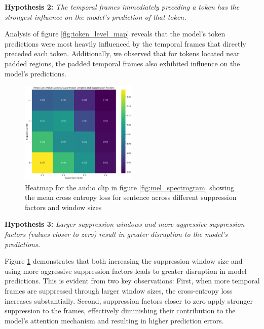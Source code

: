 \documentclass[../report.tex]{subfiles}
\begin{document}
    \textbf{Hypothesis 2:} \textit{The temporal frames immediately preceding a token has the strongest influence on the model's prediction of that token.}

    Analysis of figure \ref{fig:token_level_map} reveals that the model's token predictions were most heavily influenced by the temporal frames that directly preceded each token. Additionally, we observed that for tokens located near padded regions, the padded temporal frames also exhibited influence on the model's predictions.

    \begin{figure}[ht]
        \centering
        \includegraphics[width=0.5\textwidth]{figures/mean_loss_heatmap.png}
        \caption{Heatmap for the audio clip in figure \ref{fig:mel_spectrogram} showing the mean cross entropy loss for sentence across different suppression factors and window sizes}
        \label{fig:mean_loss_heatmap}
    \end{figure}

    \textbf{Hypothesis 3:} \textit{Larger suppression windows and more aggressive suppression factors (values closer to zero) result in greater disruption to the model's predictions.}

    Figure \ref{fig:mean_loss_heatmap} demonstrates that both increasing the suppression window size and using more aggressive suppression factors leads to greater disruption in model predictions. This is evident from two key observations: First, when more temporal frames are suppressed through larger window sizes, the cross-entropy loss increases substantially. Second, suppression factors closer to zero apply stronger suppression to the frames, effectively diminishing their contribution to the model's attention mechanism and resulting in higher prediction errors.
\end{document}
